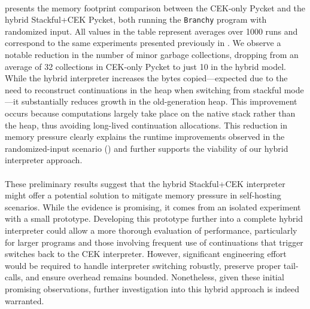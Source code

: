       \paragraph{}%
         presents the memory footprint comparison between the CEK-only Pycket and the hybrid Stackful+CEK Pycket, both running the \texttt{Branchy} program with randomized input. All values in the table represent averages over 1000 runs and correspond to the same experiments presented previously in . We observe a notable reduction in the number of minor garbage collections, dropping from an average of 32 collections in CEK-only Pycket to just 10 in the hybrid model. While the hybrid interpreter increases the bytes copied—expected due to the need to reconstruct continuations in the heap when switching from stackful mode—it substantially reduces growth in the old-generation heap. This improvement occurs because computations largely take place on the native stack rather than the heap, thus avoiding long-lived continuation allocations. This reduction in memory pressure clearly explains the runtime improvements observed in the randomized-input scenario () and further supports the viability of our hybrid interpreter approach.

      \paragraph{}%
        These preliminary results suggest that the hybrid Stackful+CEK interpreter might offer a potential solution to mitigate memory pressure in self-hosting scenarios. While the evidence is promising, it comes from an isolated experiment with a small prototype. Developing this prototype further into a complete hybrid interpreter could allow a more thorough evaluation of performance, particularly for larger programs and those involving frequent use of continuations that trigger switches back to the CEK interpreter. However, significant engineering effort would be required to handle interpreter switching robustly, preserve proper tail-calls, and ensure overhead remains bounded. Nonetheless, given these initial promising observations, further investigation into this hybrid approach is indeed warranted.


